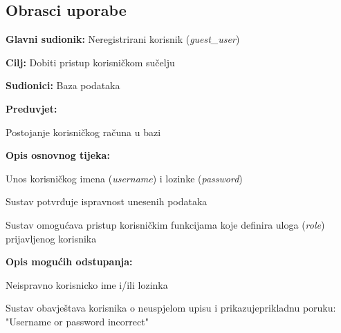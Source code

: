 			
				
			\subsection{Obrasci uporabe}

					\noindent {}
				\begin{packed_item}
					
					\item \textbf{Glavni sudionik: }Neregistrirani korisnik (\textit{guest\_user})
					\item  \textbf{Cilj: }Dobiti pristup korisničkom sučelju
					\item  \textbf{Sudionici: }Baza podataka
				\item \textbf{Preduvjet: }
				\begin{packed_enum}\item Postojanje korisničkog računa u bazi\end{packed_enum}
					\item  \textbf{Opis osnovnog tijeka: }
					
					\item[] \begin{packed_enum}
						
						\item Unos korisničkog imena (\textit{username}) i lozinke (\textit{password})
						\item Sustav potvrđuje ispravnost unesenih podataka
						\item Sustav omogućava pristup korisničkim funkcijama koje definira uloga (\textit{role}) prijavljenog korisnika
						
					\end{packed_enum}
					
					\item  \textbf{Opis mogućih odstupanja: }
					
					\item[] \begin{packed_item}
						
						\item[1] Neispravno korisnicko ime i/ili lozinka
						\item[ ] \begin{packed_enum}
							
							\item[1.1] Sustav obavještava korisnika o neuspjelom upisu i prikazuje\newline prikladnu poruku:  \text "Username or password incorrect"
							
						\end{packed_enum}
						
					\end{packed_item}
				\end{packed_item}
				
